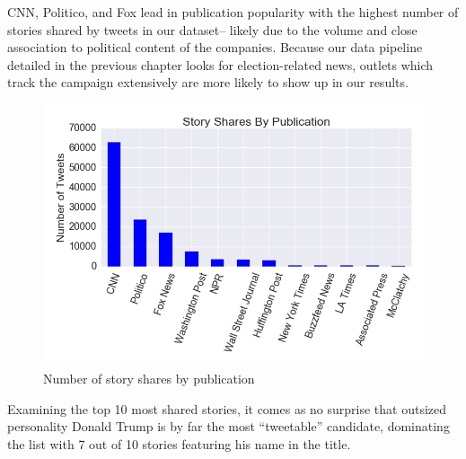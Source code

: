 \documentclass[letterpaper]{article}
\begin{document}
{CNN, Politico, and Fox lead in publication popularity with the highest number of stories shared by tweets in our dataset-- likely due to the volume and close association to political content of the companies. Because our data pipeline detailed in the previous chapter looks for election-related news, outlets which track the campaign extensively are more likely to show up in our results.


\begin{figure}[t!]  
\centering 
  \includegraphics[width=\columnwidth]{all-stories-by-pub}  
  \caption{Number of story shares by publication
    \label{fig:tweets-by-pub}}
\end{figure} 



Examining the top 10 most shared stories, it comes as no surprise that outsized personality Donald Trump is by far the most ``tweetable'' candidate, dominating the list with 7 out of 10 stories featuring his name in the title.

}
\end{document}
